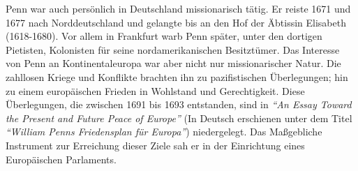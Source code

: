 \medskip

Penn war auch persönlich in Deutschland missionarisch tätig. Er reiste 1671 und 1677
nach Norddeutschland und gelangte bis an den Hof
der Äbtissin Elisabeth (1618-1680). Vor
allem in Frankfurt warb Penn später, unter den dortigen
Pietisten,
Kolonisten für seine nordamerikanischen Besitztümer. Das Interesse von Penn an Kontinentaleuropa war
aber nicht nur missionarischer Natur. Die zahllosen Kriege und Konflikte brachten
ihn zu pazifistischen
Überlegungen; hin zu einem europäischen Frieden in
Wohlstand und Gerechtigkeit. Diese Überlegungen, die
zwischen 1691 bis 1693 entstanden, sind in \textit{"`An Essay Toward the Present and Future
Peace of Europe"'} (In Deutsch erschienen unter dem Titel \textit{"`William Penns
Friedensplan für Europa"'}) niedergelegt. Das Maßgebliche Instrument zur
Erreichung dieser Ziele sah er in der Einrichtung eines Europäischen Parlaments.


